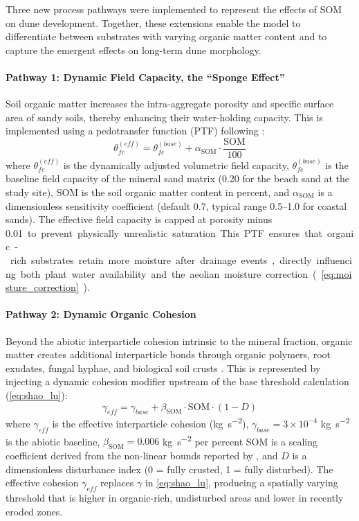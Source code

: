 \documentclass[authoryear,preprint,review,12pt]{elsarticle}
\newcommand{\SOM}{\mathrm{SOM}}
\begin{document}
Three new process pathways were implemented to represent the effects of SOM on dune development. Together, these extensions enable the model to differentiate between substrates with varying organic matter content and to capture the emergent effects on long-term dune morphology.

\paragraph{Pathway 1: Dynamic Field Capacity, the ``Sponge Effect''}

Soil organic matter increases the intra-aggregate porosity and specific surface area of sandy soils, thereby enhancing their water-holding capacity. This is implemented using a pedotransfer function (PTF) following \citet{saxton2006soil}:
\begin{equation}
\theta_{fc}^{(eff)} = \theta_{fc}^{(base)} + \alpha_{\SOM} \cdot \frac{\SOM}{100}
\label{eq:ptf}
\end{equation}
where $\theta_{fc}^{(eff)}$ is the dynamically adjusted volumetric field capacity, $\theta_{fc}^{(base)}$ is the baseline field capacity of the mineral sand matrix (\num{0.20} for the beach sand at the study site), $\SOM$ is the soil organic matter content in percent, and $\alpha_{\SOM}$ is a dimensionless sensitivity coefficient (default \num{0.7}, typical range 0.5--1.0 for coastal sands). The effective field capacity is capped at porosity minus \SI{0.01} to prevent physically unrealistic saturation. This PTF ensures that organic-rich substrates retain more moisture after drainage events, directly influencing both plant water availability and the aeolian moisture correction (\cref{eq:moisture_correction}).

\paragraph{Pathway 2: Dynamic Organic Cohesion}

Beyond the abiotic interparticle cohesion intrinsic to the mineral fraction, organic matter creates additional interparticle bonds through organic polymers, root exudates, fungal hyphae, and biological soil crusts \citep{zobeck2013soil}. This is represented by injecting a dynamic cohesion modifier upstream of the base threshold calculation (\cref{eq:shao_lu}):
\begin{equation}
\gamma_{eff} = \gamma_{base} + \beta_{\SOM} \cdot \SOM \cdot \left(1 - D\right)
\label{eq:organic_cohesion}
\end{equation}
where $\gamma_{eff}$ is the effective interparticle cohesion (\si{\kilo\gram\per\second\squared}), $\gamma_{base} = 3 \times 10^{-4}$ \si{\kilo\gram\per\second\squared} is the abiotic baseline, $\beta_{\SOM} = 0.006$ \si{\kilo\gram\per\second\squared} per percent SOM is a scaling coefficient derived from the non-linear bounds reported by \citet{zobeck2013soil}, and $D$ is a dimensionless disturbance index (0 = fully crusted, 1 = fully disturbed). The effective cohesion $\gamma_{eff}$ replaces $\gamma$ in \cref{eq:shao_lu}, producing a spatially varying threshold that is higher in organic-rich, undisturbed areas and lower in recently eroded zones.
\end{document}
